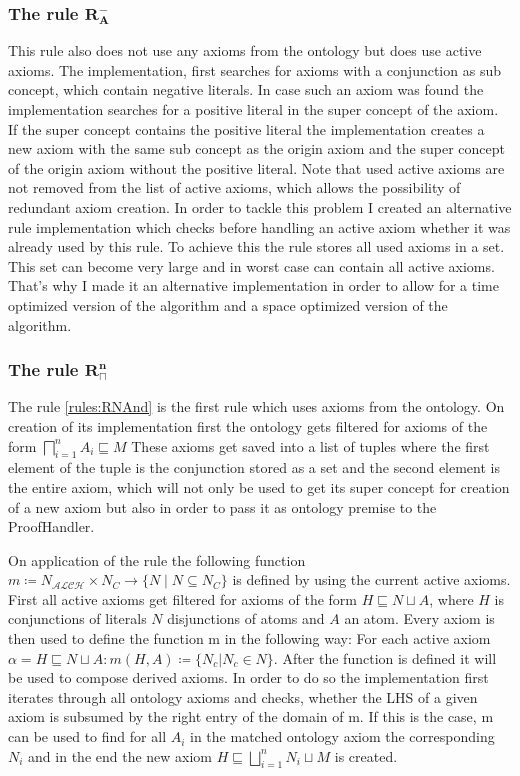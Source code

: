 \documentclass[titlepage]{article}
\begin{document}
\subsubsection{The rule $\mathbf{R^{-}_A}$}
This rule also does not use any axioms from the ontology but does use active axioms.
The implementation, first searches for axioms with a conjunction as sub concept, which contain negative
literals. In case such an axiom was found the implementation searches for a positive literal in the super concept
of the axiom. If the super concept contains the positive literal the implementation creates a new axiom with 
the same sub concept as the origin axiom and the super concept of the origin axiom without the positive literal.
Note that used active axioms are not removed from the list of active axioms, which allows the possibility of
redundant axiom creation. In order to tackle this problem I created an alternative rule implementation
which checks before handling an active axiom
whether it was already used by this rule. To achieve this the rule stores all used axioms in a set. This set can 
become very large and in worst case can contain all active axioms. That's why I made it an alternative implementation
in order to allow for a time optimized version of the algorithm and a space optimized version of the algorithm.

\subsubsection{The rule $\mathbf{R^{n}_{\sqcap}}$}

The rule \ref{rules:RNAnd} is the first rule which uses axioms from the ontology.
On creation of its implementation first the ontology
gets filtered for axioms of the form $\bigsqcap^{n}_{i=1} A_i \sqsubseteq M$
These axioms get saved into a list of tuples where the first element of the tuple is the conjunction
stored as a set and the second element is the entire axiom, which will not only be used to get its super concept
for creation of a new axiom but also in order to pass it as ontology premise to the ProofHandler.

On application of the rule the following 
function $m  \coloneqq N_{\mathcal{ALCH}} \times N_C \rightarrow \{N \mid N \subseteq N_C\}$
is defined by using the current active axioms. First all active axioms get filtered for
axioms of the form $H \sqsubseteq N \sqcup A$, where $H$ is conjunctions of literals $N$ disjunctions
 of atoms and $A$ an atom. Every axiom is then used to define the function m in the following way:
 For each active axiom $\alpha = H \sqsubseteq N \sqcup A: m(H,A) \coloneqq \{N_c | N_c \in N\}$.
 After the function is defined it will be used to compose derived axioms.
 In order to do so the implementation first iterates through all ontology axioms and checks,
 whether the LHS of a given axiom is subsumed by the right entry of the domain of m. If this is
 the case, m can be used to find for all $A_i$ in the matched ontology axiom the corresponding
 $N_i$ and in the end the new axiom $H \sqsubseteq \bigsqcup^{n}_{i=1} N_i \sqcup M$ is created.
\end{document}
